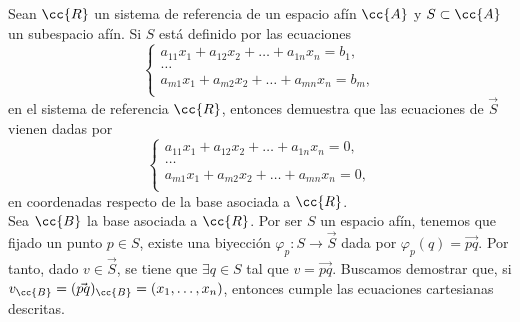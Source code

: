 \begin{ejercicio}
    Sean $\cc{R}$ un sistema de referencia de un espacio afín $\cc{A}$ y $S \subset \cc{A}$ un subespacio afín. Si $S$ está definido por las ecuaciones
    \begin{equation*}
        \left\{\begin{array}{c}
            a_{11}x_1+a_{12}x_2 + \dots + a_{1n}x_n=b_1, \\
            \dots \\
            a_{m1}x_1+a_{m2}x_2 + \dots + a_{mn}x_n=b_m, \\
        \end{array}\right.
    \end{equation*}
    en el sistema de referencia $\cc{R}$, entonces demuestra que las ecuaciones de $\vec{S}$ vienen dadas por
    \begin{equation*}
        \left\{\begin{array}{c}
            a_{11}x_1+a_{12}x_2 + \dots + a_{1n}x_n=0, \\
            \dots \\
            a_{m1}x_1+a_{m2}x_2 + \dots + a_{mn}x_n=0, \\
        \end{array}\right.
    \end{equation*}
    en coordenadas respecto de la base asociada a $\cc{R}$.\\

    Sea $\cc{B}$ la base asociada a $\cc{R}$. 
    Por ser $S$ un espacio afín, tenemos que fijado un punto $p\in S$, existe una biyección $\varphi_p:S\to \vec{S}$ dada por $\varphi_p(q)=\vec{pq}$. Por tanto, dado $v\in \vec{S}$, se tiene que $\exists q\in S$ tal que $v=\vec{pq}$. Buscamos demostrar que, si $v_{\cc{B}}=(\vec{pq})_{\cc{B}}=(x_1,\dots,x_n)$, entonces cumple las ecuaciones cartesianas descritas.
    

\end{ejercicio}
